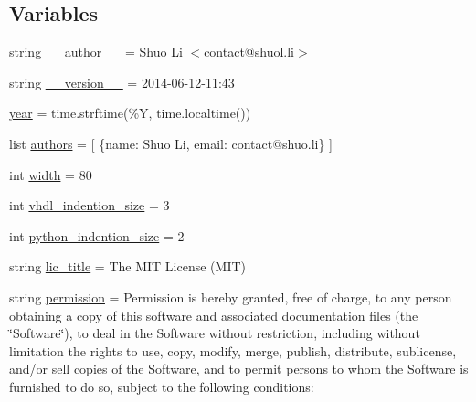 \subsection*{Variables}
\begin{DoxyCompactItemize}
\item 
string \hyperlink{namespacesylva_1_1code__generation_1_1mit__license_a52a488c113051a959c0c636a4f8bb481}{\+\_\+\+\_\+author\+\_\+\+\_\+} = \textquotesingle{}Shuo Li $<$contact@shuol.\+li$>$\textquotesingle{}
\item 
string \hyperlink{namespacesylva_1_1code__generation_1_1mit__license_a6ba30e6b387a7b34c71df70602883177}{\+\_\+\+\_\+version\+\_\+\+\_\+} = \textquotesingle{}2014-\/06-\/12-\/11\+:43\textquotesingle{}
\item 
\hyperlink{namespacesylva_1_1code__generation_1_1mit__license_a4902e976e16e0ac4d890af277506dc41}{year} = time.\+strftime(\textquotesingle{}\%Y\textquotesingle{}, time.\+localtime())
\item 
list \hyperlink{namespacesylva_1_1code__generation_1_1mit__license_ab235b5262a6f93e7dcdef3c73e16621a}{authors} = \mbox{[} \{\textquotesingle{}name\textquotesingle{}\+: \textquotesingle{}Shuo Li\textquotesingle{}, \textquotesingle{}email\textquotesingle{}\+: \textquotesingle{}contact@shuo.\+li\textquotesingle{}\} \mbox{]}
\item 
int \hyperlink{namespacesylva_1_1code__generation_1_1mit__license_aec2b80ac82983fcc3ba9bae02fb001d1}{width} = 80
\item 
int \hyperlink{namespacesylva_1_1code__generation_1_1mit__license_a74f6e9d6351c0499cc490f9457d4baf2}{vhdl\+\_\+indention\+\_\+size} = 3
\item 
int \hyperlink{namespacesylva_1_1code__generation_1_1mit__license_a56cd97ae81f6c650978da8a12f279175}{python\+\_\+indention\+\_\+size} = 2
\item 
string \hyperlink{namespacesylva_1_1code__generation_1_1mit__license_a85aa303c71412d6df9e78ae4d0de5c28}{lic\+\_\+title} = \textquotesingle{}The M\+IT License (M\+IT)\textquotesingle{}
\item 
string \hyperlink{namespacesylva_1_1code__generation_1_1mit__license_af67ea5ac7bf8aeac183aefb908f601e2}{permission} = \textquotesingle{}Permission is hereby granted, free of charge, to any person obtaining a copy of this software and associated documentation files (the \char`\"{}Software\char`\"{}), to deal in the Software without restriction, including without limitation the rights to use, copy, modify, merge, publish, distribute, sublicense, and/or sell copies of the Software, and to permit persons to whom the Software is furnished to do so, subject to the following conditions\+:\textquotesingle{}

\end{DoxyCompactItemize}
